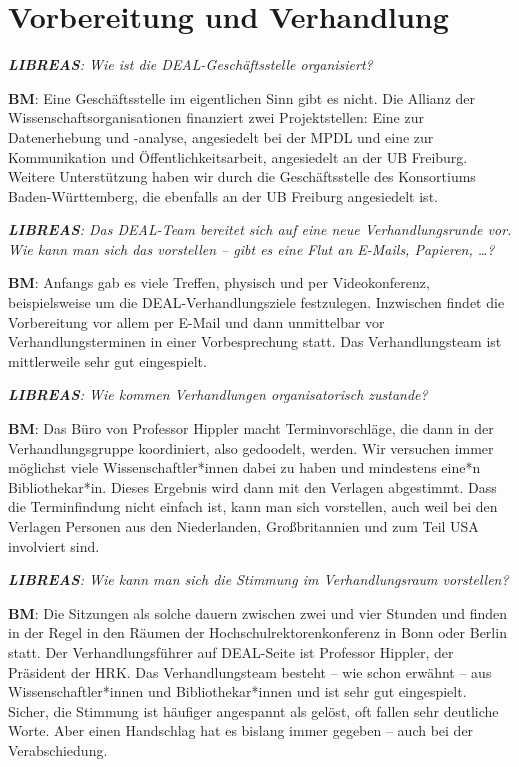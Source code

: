 \documentclass[a4paper,
fontsize=11pt,
oneside,
numbers=noperiodatend,
parskip=half-,
bibliography=totoc,
final
]{scrartcl}
\begin{document}
\section{Vorbereitung und
Verhandlung}\label{vorbereitung-und-verhandlung}

\emph{\textbf{LIBREAS}: Wie ist die DEAL-Geschäftsstelle organisiert?}

\textbf{BM}: Eine Geschäftsstelle im eigentlichen Sinn gibt es nicht.
Die Allianz der Wissenschaftsorganisationen finanziert zwei
Projektstellen: Eine zur Datenerhebung und -analyse, angesiedelt bei der
MPDL und eine zur Kommunikation und Öffentlichkeitsarbeit, angesiedelt
an der UB Freiburg. Weitere Unterstützung haben wir durch die
Geschäftsstelle des Konsortiums Baden-Württemberg, die ebenfalls an der
UB Freiburg angesiedelt ist.

\emph{\textbf{LIBREAS}: Das DEAL-Team bereitet sich auf eine neue
Verhandlungsrunde vor. Wie kann man sich das vorstellen -- gibt es eine
Flut an E-Mails, Papieren, \ldots{}?}

\textbf{BM}: Anfangs gab es viele Treffen, physisch und per
Videokonferenz, beispielsweise um die DEAL-Verhandlungsziele
festzulegen. Inzwischen findet die Vorbereitung vor allem per E-Mail und
dann unmittelbar vor Verhandlungsterminen in einer Vorbesprechung statt.
Das Verhandlungsteam ist mittlerweile sehr gut eingespielt.

\emph{\textbf{LIBREAS}: Wie kommen Verhandlungen organisatorisch
zustande?}

\textbf{BM}: Das Büro von Professor Hippler macht Terminvorschläge, die
dann in der Verhandlungsgruppe koordiniert, also gedoodelt, werden. Wir
versuchen immer möglichst viele Wissenschaftler*innen dabei zu haben und
mindestens eine*n Bibliothekar*in. Dieses Ergebnis wird dann mit den
Verlagen abgestimmt. Dass die Terminfindung nicht einfach ist, kann man
sich vorstellen, auch weil bei den Verlagen Personen aus den
Niederlanden, Großbritannien und zum Teil USA involviert sind.

\emph{\textbf{LIBREAS}: Wie kann man sich die Stimmung im
Verhandlungsraum vorstellen?}

\textbf{BM}: Die Sitzungen als solche dauern zwischen zwei und vier
Stunden und finden in der Regel in den Räumen der
Hochschulrektorenkonferenz in Bonn oder Berlin statt. Der
Verhandlungsführer auf DEAL-Seite ist Professor Hippler, der Präsident
der HRK. Das Verhandlungsteam besteht -- wie schon erwähnt -- aus
Wissenschaftler*innen und Bibliothekar*innen und ist sehr gut
eingespielt. Sicher, die Stimmung ist häufiger angespannt als gelöst,
oft fallen sehr deutliche Worte. Aber einen Handschlag hat es bislang
immer gegeben -- auch bei der Verabschiedung.
\end{document}
